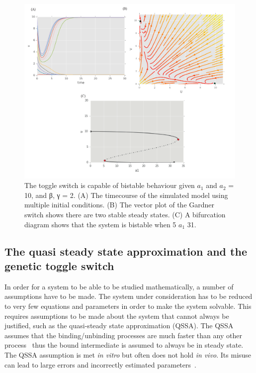 \begin{figure}[htbp]
\centerfloat
\includegraphics[scale=0.7]{../../chapters/chapterABCSysBio/images/Gard_CS.pdf}
\caption[Phase space and bifurcation analysis of the Gardner toggle switch]{\label{fig:Gard_CS}The \textcite{Gardner:2000vha} toggle switch is capable of bistable behaviour given $a_1$ and $a_2$ = 10, and β, γ = 2. (A) The timecourse of the simulated model using multiple initial conditions. (B) The vector plot of the Gardner switch shows there are two stable steady states. (C) A bifurcation diagram shows that the system is bistable when 5 \ge{} $a_1$ \le{} 31.}
\end{figure}
\clearpage



\subsection{The quasi steady state approximation and the genetic toggle switch}
\label{sec:qssa}
In order for a system to be able to be studied mathematically, a number of assumptions have to be made. The system under consideration has to be reduced to very few equations and parameters in order to make the system solvable. This requires assumptions to be made about the system that cannot always be justified, such as the quasi-steady state approximation (QSSA). The QSSA assumes that the binding/unbinding processes are much faster than any other process~\autocite{Loinger:2007vma} thus the bound intermediate is assumed to always be in steady state. The QSSA assumption is met \textit{in vitro} but often does not hold \textit{in vivo}. Its misuse can lead to large errors and incorrectly estimated parameters~\autocite{Pedersen:2007ke}.

